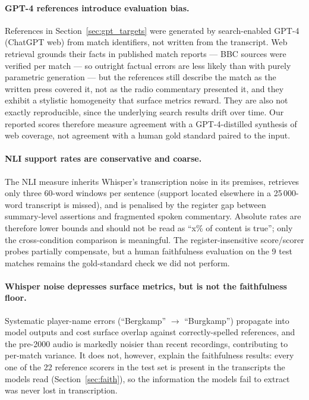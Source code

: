 \documentclass[10pt,a4paper]{article}
\begin{document}
\paragraph{GPT-4 references introduce evaluation bias.} References in Section~\ref{sec:gpt_targets} were generated by search-enabled GPT-4 (ChatGPT web) from match identifiers, not written from the transcript. Web retrieval grounds their facts in published match reports --- BBC sources were verified per match --- so outright factual errors are less likely than with purely parametric generation --- but the references still describe the match as the written press covered it, not as the radio commentary presented it, and they exhibit a stylistic homogeneity that surface metrics reward. They are also not exactly reproducible, since the underlying search results drift over time. Our reported scores therefore measure agreement with a GPT-4-distilled synthesis of web coverage, not agreement with a human gold standard paired to the input.

\paragraph{NLI support rates are conservative and coarse.} The NLI measure inherits Whisper's transcription noise in its premises, retrieves only three 60-word windows per sentence (support located elsewhere in a 25\,000-word transcript is missed), and is penalised by the register gap between summary-level assertions and fragmented spoken commentary. Absolute rates are therefore lower bounds and should not be read as ``x\% of content is true''; only the cross-condition comparison is meaningful. The register-insensitive score/scorer probes partially compensate, but a human faithfulness evaluation on the 9 test matches remains the gold-standard check we did not perform.

\paragraph{Whisper noise depresses surface metrics, but is not the faithfulness floor.} Systematic player-name errors (``Bergkamp'' $\to$ ``Burgkamp'') propagate into model outputs and cost surface overlap against correctly-spelled references, and the pre-2000 audio is markedly noisier than recent recordings, contributing to per-match variance. It does not, however, explain the faithfulness results: every one of the 22 reference scorers in the test set is present in the transcripts the models read (Section~\ref{sec:faith}), so the information the models fail to extract was never lost in transcription.
\end{document}
